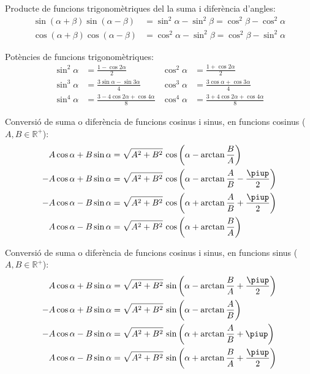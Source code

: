 Producte de funcions trigonom\`{e}triques del la suma i difer\`{e}ncia
d'angles:
\begin{subequations}
\begin{align}
    \sin(\alpha+\beta) \sin(\alpha-\beta) &= \sin^2\alpha-\sin^2\beta =
    \cos^2\beta - \cos^2\alpha\\[1ex]
    \cos(\alpha+\beta) \cos(\alpha-\beta) &= \cos^2\alpha-\sin^2\beta =
    \cos^2\beta - \sin^2\alpha
\end{align}
\end{subequations}

Pot\`{e}ncies de funcions trigonom\`{e}triques:
\begin{subequations}
\begin{align}
    \sin^2\alpha &= \frac{1-\cos 2\alpha}{2} &  \cos^2\alpha &= \frac{1+\cos 2\alpha}{2}\\[1ex]
    \sin^3\alpha &= \frac{3\sin\alpha-\sin 3\alpha}{4} &  \cos^3\alpha &= \frac{3\cos\alpha+\cos 3\alpha}{4}\\[1ex]
    \sin^4\alpha &= \frac{3-4\cos 2\alpha+\cos 4\alpha}{8} &  \cos^4\alpha &= \frac{3+4\cos 2\alpha+\cos 4\alpha}{8}
\end{align}
\end{subequations}

Conversi\'{o} de suma o difer\`{e}ncia de funcions cosinus i sinus, en
funcions cosinus ($A,B\in\mathbb{R}^+$):
\begin{subequations}
\begin{align}
    A \cos \alpha +B \sin \alpha &= \sqrt{A^2+B^2}\, \cos \left(\alpha - \arctan\frac{B}{A}\right)\label{eq:AcosBsin}\\
    -A \cos \alpha +B \sin \alpha &= \sqrt{A^2+B^2}\, \cos \left(\alpha - \arctan\frac{A}{B} - \frac{\piup}{2}\right)\\
    -A \cos \alpha -B \sin \alpha &= \sqrt{A^2+B^2}\, \cos \left(\alpha + \arctan\frac{A}{B} + \frac{\piup}{2}\right)\label{eq:-Acos-Bsin}\\
    A \cos \alpha -B \sin \alpha &= \sqrt{A^2+B^2}\, \cos \left(\alpha + \arctan\frac{B}{A}\right)
\end{align}
\end{subequations}

Conversi\'{o} de suma o difer\`{e}ncia de funcions cosinus i sinus, en
funcions sinus ($A,B\in\mathbb{R}^+$):
\begin{subequations}
\begin{align}
    A \cos \alpha +B \sin \alpha &= \sqrt{A^2+B^2}\, \sin \left(\alpha - \arctan\frac{B}{A} +\frac{\piup}{2}\right)\\
    -A \cos \alpha +B \sin \alpha &= \sqrt{A^2+B^2}\, \sin \left(\alpha - \arctan\frac{A}{B}\right)\\
    -A \cos \alpha -B \sin \alpha &= \sqrt{A^2+B^2}\, \sin \left(\alpha + \arctan\frac{A}{B} + \piup\right)\\
    A \cos \alpha -B \sin \alpha &= \sqrt{A^2+B^2}\, \sin \left(\alpha + \arctan\frac{B}{A}+\frac{\piup}{2}\right)
\end{align}
\end{subequations}


